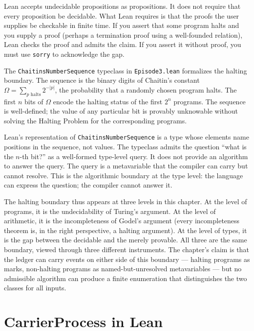Lean accepts undecidable propositions as propositions. It does not require
that every proposition be decidable. What Lean requires is that the proofs
the user supplies be checkable in finite time. If you assert that some
program halts and you supply a proof (perhaps a termination proof using a
well-founded relation), Lean checks the proof and admits the claim. If you
assert it without proof, you must use \texttt{sorry} to acknowledge the gap.

The \texttt{ChaitinsNumberSequence} typeclass in \texttt{Episode3.lean}
formalizes the halting boundary. The sequence is the binary digits of
Chaitin's constant $\Omega = \sum_{p \text{ halts}} 2^{-|p|}$, the
probability that a randomly chosen program halts. The first $n$ bits of
$\Omega$ encode the halting status of the first $2^n$ programs. The
sequence is well-defined; the value of any particular bit is provably
unknowable without solving the Halting Problem for the corresponding
programs.

Lean's representation of \texttt{ChaitinsNumberSequence} is a type whose
elements name positions in the sequence, not values. The typeclass admits
the question ``what is the $n$-th bit?'' as a well-formed type-level query.
It does not provide an algorithm to answer the query. The query is a
metavariable that the compiler can carry but cannot resolve. This is the
algorithmic boundary at the type level: the language can express the
question; the compiler cannot answer it.

The halting boundary thus appears at three levels in this chapter. At the
level of programs, it is the undecidability of Turing's argument. At the
level of arithmetic, it is the incompleteness of Godel's argument (every
incompleteness theorem is, in the right perspective, a halting argument).
At the level of types, it is the gap between the decidable and the merely
provable. All three are the same boundary, viewed through three different
instruments. The chapter's claim is that the ledger can carry events on
either side of this boundary --- halting programs as marks, non-halting
programs as named-but-unresolved metavariables --- but no admissible
algorithm can produce a finite enumeration that distinguishes the two
classes for all inputs.

\section{CarrierProcess in Lean}
\label{se:carrierprocess-in-lean}

